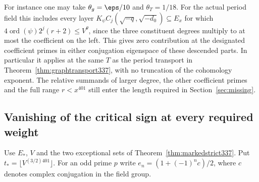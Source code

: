 \documentclass[a4paper,11pt]{article}
\theoremstyle{definition}
\theoremstyle{remark}
\numberwithin{equation}{section}
\begin{document}
For instance one may take \(\theta_g=\eps/10\) and \(\theta_T=1/18\).
For the actual period field this includes every layer
\(K_\psi C_j(\sqrt{-q},\sqrt{-d_0})\subseteq E_x\) for which
\(4\operatorname{ord}(\psi)2^j(r+2)\le V^\theta\), since the
three constituent degrees multiply to at most the coefficient on
the left. This gives zero contribution at the designated coefficient
primes in either conjugation eigenspace of these descended parts.
In particular it applies at the same \(T\) as the period transport
in Theorem~\ref{thm:graphtransport337}, with no truncation of the
cohomology exponent. The relative summands of larger degree, the
other coefficient primes and the full range \(r<x^{401}\) still
enter the length required in Section~\ref{sec:missing}.


\subsection{Vanishing of the critical sign at every required weight}\label{sec:criticalmarks339}
Use \(E_*\), \(V\) and the two exceptional sets of
Theorem~\ref{thm:markedstrict337}. Put
\(t_*=\lfloor V^{(3/2)401}\rfloor\). For an odd prime \(p\)
write \(e_n=(1+(-1)^n c)/2\), where \(c\) denotes complex
conjugation in the field group.
\end{document}
